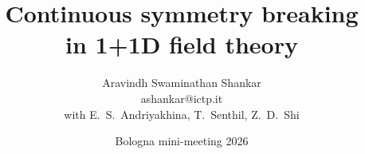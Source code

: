 \title[Continuous symmetry breaking in 1+1D]{Continuous symmetry breaking\\ in 1+1D field theory}
\author[A. S. Shankar]{Aravindh Swaminathan Shankar \\[2pt] {\footnotesize ashankar@ictp.it}\\[4pt]
{\scriptsize with E.~S.~Andriyakhina, T.~Senthil, Z.~D.~Shi}}
\date[Bologna 2026]{Bologna mini-meeting 2026}


\newcommand{\ft}[1]{\vspace*{0.25cm}\textbf{#1}\smallskip\par\noindent{\color{mygray}\rule[1.0ex]{\linewidth}{0.5pt}}\vspace*{-0.35cm}}
\newcommand{\tk}[1]{\par\vfill\noindent\colorbox{LightGray}{\parbox{\dimexpr\linewidth-2\fboxsep}{\centering\small #1}}\vspace*{-0.2cm}}

\newcommand{\phaseline}[2]{%
\begin{tikzpicture}[font=\scriptsize]
 \draw[cLL,line width=3pt] (0,0)--(2.4,0);
 \draw[cFM,line width=3pt] (2.4,0)--(4.8,0);
 \draw[-{Stealth},thick] (4.8,0)--(5.2,0) node[right,black] {#2};
 \fill[cQCP] (2.4,0) circle (0.13);
 \node[cLL,above] at (1.2,0.08) {Luttinger liquid};
 \node[cFM,above] at (3.6,0.08) {ferromagnet};
 \node[cQCP,below] at (2.4,-0.12) {QCP};
 \node[left] at (-0.05,0) {#1};
\end{tikzpicture}}


